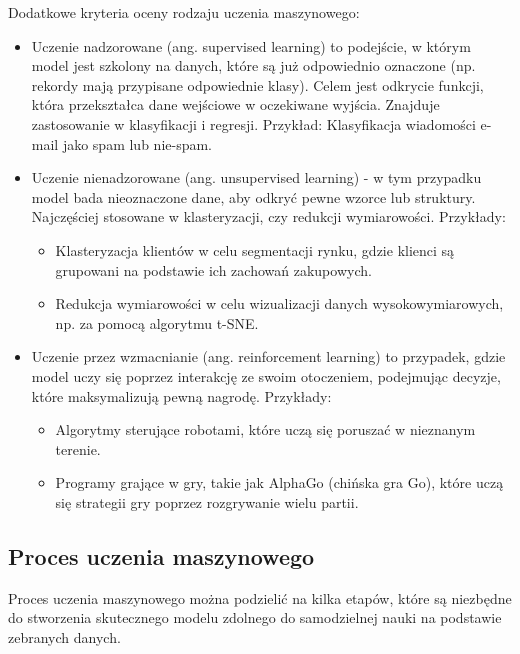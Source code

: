 Dodatkowe kryteria oceny rodzaju uczenia maszynowego:
\begin{itemize}[label=-,labelsep=0.4cm,leftmargin=0.6cm]
    \item Uczenie nadzorowane (ang. supervised learning) to podejście, w którym model jest szkolony na danych,
        które są już odpowiednio oznaczone (np. rekordy mają przypisane odpowiednie klasy).
        Celem jest odkrycie funkcji, która przekształca dane wejściowe w oczekiwane wyjścia.
        Znajduje zastosowanie w klasyfikacji i regresji.
        Przykład: Klasyfikacja wiadomości e-mail jako spam lub nie-spam.
    \item Uczenie nienadzorowane (ang. unsupervised learning)
        - w tym przypadku model bada nieoznaczone dane, aby odkryć pewne wzorce lub struktury.
        Najczęściej stosowane w klasteryzacji, czy redukcji wymiarowości. Przykłady:
        \begin{itemize}[label=*,labelsep=0.4cm,leftmargin=0.8cm]
            \item Klasteryzacja klientów w celu segmentacji rynku, gdzie klienci są grupowani na podstawie ich zachowań zakupowych. 
            \item Redukcja wymiarowości w celu wizualizacji danych wysokowymiarowych, np. za pomocą algorytmu t-SNE.
        \end{itemize}
    \item Uczenie przez wzmacnianie (ang. reinforcement learning) to przypadek,
        gdzie model uczy się poprzez interakcję ze swoim otoczeniem,
        podejmując decyzje, które maksymalizują pewną nagrodę. Przykłady:
        \begin{itemize}[label=*,labelsep=0.4cm,leftmargin=0.8cm]
            \item Algorytmy sterujące robotami, które uczą się poruszać w nieznanym terenie. 
            \item Programy grające w gry, takie jak AlphaGo (chińska gra Go), które uczą się strategii gry poprzez rozgrywanie wielu partii.
        \end{itemize}
\end{itemize}

\subsection{Proces uczenia maszynowego}
Proces uczenia maszynowego można podzielić na kilka etapów,
które są niezbędne do stworzenia skutecznego modelu zdolnego do samodzielnej nauki na podstawie zebranych danych.


